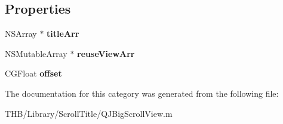 \subsection*{Properties}
\begin{DoxyCompactItemize}
\item 
\mbox{\label{category_q_j_big_scroll_view_07_08_a0ec66d392b37bc583c8590df90ec003e}} 
N\+S\+Array $\ast$ {\bfseries title\+Arr}
\item 
\mbox{\label{category_q_j_big_scroll_view_07_08_acc12ec4bde19f12834655119e17819f5}} 
N\+S\+Mutable\+Array $\ast$ {\bfseries reuse\+View\+Arr}
\item 
\mbox{\label{category_q_j_big_scroll_view_07_08_a3c178b019c7da45c9b8c1cf73a024143}} 
C\+G\+Float {\bfseries offset}
\end{DoxyCompactItemize}


The documentation for this category was generated from the following file\+:\begin{DoxyCompactItemize}
\item 
T\+H\+B/\+Library/\+Scroll\+Title/Q\+J\+Big\+Scroll\+View.\+m\end{DoxyCompactItemize}
